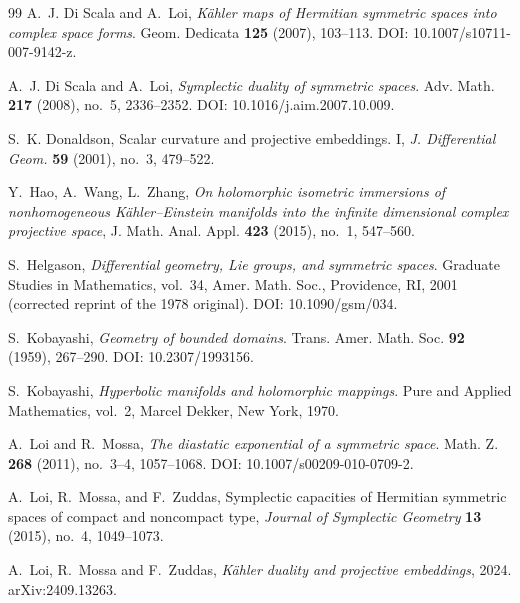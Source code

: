 \documentclass[reqno, 11pt]{amsart}
\begin{document}
\begin{thebibliography}{99}
\label{DISCALALOI2007KmapHSSintoCP}
A.~J. Di Scala and A.~Loi, \textit{K\"{a}hler maps of Hermitian symmetric spaces into complex space forms}. Geom. Dedicata \textbf{125} (2007), 103--113. DOI: 10.1007/s10711-007-9142-z.

\label{DISCALALOI2008sympdual}
A.~J. Di Scala and A.~Loi, \textit{Symplectic duality of symmetric spaces}. Adv. Math. \textbf{217} (2008), no.~5, 2336--2352. DOI: 10.1016/j.aim.2007.10.009.

S.~K. Donaldson,
\newblock Scalar curvature and projective embeddings. I,
\newblock \emph{J. Differential Geom.} \textbf{59} (2001), no.~3, 479--522.


Y.~Hao, A.~Wang, L.~Zhang,
\emph{On holomorphic isometric immersions of nonhomogeneous K\"ahler--Einstein manifolds into the infinite dimensional complex projective space},
J. Math. Anal. Appl. \textbf{423} (2015), no.~1, 547--560.

\label{HELGASONbookDiffGeom1978}
S.~Helgason, \textit{Differential geometry, Lie groups, and symmetric spaces}. Graduate Studies in Mathematics, vol.~34, Amer. Math. Soc., Providence, RI, 2001 (corrected reprint of the 1978 original). DOI: 10.1090/gsm/034.

\label{KOBAYASHI1959GeomBounded}
S.~Kobayashi, \textit{Geometry of bounded domains}. Trans. Amer. Math. Soc. \textbf{92} (1959), 267--290. DOI: 10.2307/1993156.

\label{KOBAYASHIbookHyperbMfd1970}
S.~Kobayashi, \textit{Hyperbolic manifolds and holomorphic mappings}. Pure and Applied Mathematics, vol.~2, Marcel Dekker, New York, 1970.

\label{LOIMOSSA2011DistExp}
A.~Loi and R.~Mossa, \textit{The diastatic exponential of a symmetric space}. Math. Z. \textbf{268} (2011), no.~3--4, 1057--1068. DOI: 10.1007/s00209-010-0709-2.


A.~Loi, R.~Mossa, and F.~Zuddas,
\newblock Symplectic capacities of Hermitian symmetric spaces of compact and noncompact type,
\newblock \emph{Journal of Symplectic Geometry} \textbf{13} (2015), no.~4, 1049--1073.

\label{LOIMOSSAZUDDAS2024dualemb}
A.~Loi, R.~Mossa and F.~Zuddas, \textit{K\"ahler duality and projective embeddings}, 2024. arXiv:2409.13263.


\end{thebibliography}
\end{document}

